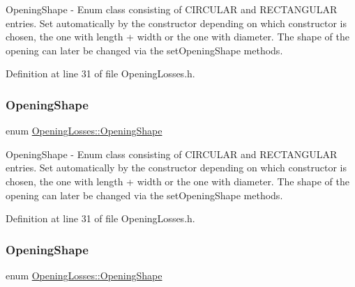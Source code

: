 Opening\+Shape -\/ Enum class consisting of C\+I\+R\+C\+U\+L\+AR and R\+E\+C\+T\+A\+N\+G\+U\+L\+AR entries. Set automatically by the constructor depending on which constructor is chosen, the one with length + width or the one with diameter. The shape of the opening can later be changed via the set\+Opening\+Shape methods. 

Definition at line 31 of file Opening\+Losses.\+h.

\mbox{\label{class_opening_losses_a57f9759b6fd72a1b75aa885800e26157}} 
\subsubsection{\texorpdfstring{Opening\+Shape}{OpeningShape}\hspace{0.1cm}{\footnotesize\ttfamily [2/3]}}
{\footnotesize\ttfamily enum \hyperlink{class_opening_losses_a57f9759b6fd72a1b75aa885800e26157}{Opening\+Losses\+::\+Opening\+Shape}\hspace{0.3cm}{\ttfamily [strong]}}

Opening\+Shape -\/ Enum class consisting of C\+I\+R\+C\+U\+L\+AR and R\+E\+C\+T\+A\+N\+G\+U\+L\+AR entries. Set automatically by the constructor depending on which constructor is chosen, the one with length + width or the one with diameter. The shape of the opening can later be changed via the set\+Opening\+Shape methods. 

Definition at line 31 of file Opening\+Losses.\+h.

\mbox{\label{class_opening_losses_a57f9759b6fd72a1b75aa885800e26157}} 
\subsubsection{\texorpdfstring{Opening\+Shape}{OpeningShape}\hspace{0.1cm}{\footnotesize\ttfamily [3/3]}}
{\footnotesize\ttfamily enum \hyperlink{class_opening_losses_a57f9759b6fd72a1b75aa885800e26157}{Opening\+Losses\+::\+Opening\+Shape}\hspace{0.3cm}{\ttfamily [strong]}}

